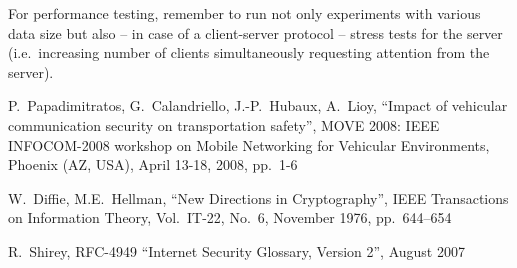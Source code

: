 \documentclass[a4paper,12pt]{article}
\def\ie{i.e.\xspace}
\def\rfc#1{RFC-#1\xspace}%
\begin{document}
For performance testing, remember to run not only experiments with various
data size but also -- in case of a client-server protocol -- stress tests
for the server (\ie\ increasing number of clients simultaneously requesting
attention from the server).

\begin{thebibliography}{99}
%
%

P.~Papadimitratos, G.~Calandriello, J.-P.~Hubaux, A.~Lioy,
``Impact of vehicular communication security on transportation safety'',
MOVE 2008: IEEE INFOCOM-2008 workshop on Mobile Networking for Vehicular Environments,
Phoenix (AZ, USA), April 13-18, 2008, pp.~1-6 

W.~Diffie, M.E.~Hellman,
``New Directions in Cryptography'',
IEEE Transactions on Information Theory,
Vol.~IT-22, No.~6,
November 1976,
pp.~644--654

R.~Shirey,
\rfc{4949} ``Internet Security Glossary, Version 2'',
August 2007

\end{thebibliography}
\end{document}
